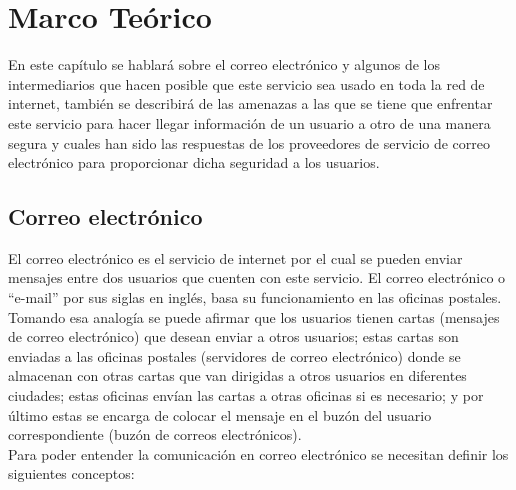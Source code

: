 \documentclass[12pt,oneside,onecolumn,openany]{report}
\begin{document}
\chapter{Marco Teórico} %
En  este  capítulo  se hablará  sobre  el  correo  electrónico  y  algunos  de  los intermediarios que hacen posible que este servicio sea usado en toda la red de  internet, también  se describirá  de  las  amenazas a  las  que  se  tiene  que  enfrentar  este  servicio para  hacer  llegar  información  de  un  usuario  a  otro  de  una  manera  segura  y  cuales  han 
sido   las   respuestas   de   los   proveedores   de   servicio   de   correo   electrónico   para proporcionar dicha seguridad a los usuarios. 


\section{Correo electrónico} 
El  correo  electrónico  es  el  servicio  de  internet  por  el cual  se  pueden  enviar  mensajes entre dos usuarios que cuenten con este servicio. El correo electrónico o “e-mail”
 por sus siglas en inglés, basa su funcionamiento en las oficinas postales. Tomando esa analogía se puede afirmar  que  los  usuarios  tienen  cartas  (mensajes  de  correo  electrónico)  que desean  enviar  a  otros  usuarios;  estas  cartas  son  enviadas  a 
las  oficinas  postales (servidores de correo electrónico) donde se almacenan con otras cartas que van dirigidas a otros usuarios en diferentes ciudades; estas oficinas envían  las cartas a otras 
oficinas   si es  necesario;  y por  último estas se  encarga de colocar el mensaje en el  buzón del usuario correspondiente (buzón  de  correos  electrónicos).\\
Para poder entender la comunicación en correo electrónico se necesitan definir los siguientes conceptos:
\end{document}
